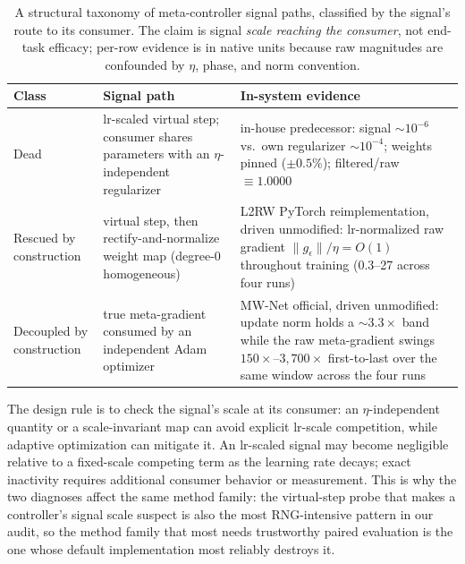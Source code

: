 \begin{table}[tbp]
\centering
\small
\begin{tabular}{@{}p{}p{}p{}@{}}
\toprule
Class & Signal path & In-system evidence \\
\midrule
Dead &
lr-scaled virtual step; consumer shares parameters with an
$\eta$-independent regularizer &
in-house predecessor: signal ${\sim}10^{-6}$ vs.\ own regularizer
${\sim}10^{-4}$; weights pinned ($\pm 0.5\%$); filtered/raw
$\equiv 1.0000$ \\
\addlinespace
Rescued by construction &
virtual step, then rectify-and-normalize weight map (degree-0 homogeneous) &
L2RW PyTorch reimplementation, driven unmodified: lr-normalized raw gradient
$\lVert g_\epsilon \rVert / \eta = O(1)$ throughout training (0.3--27
across four runs) \\
\addlinespace
Decoupled by construction &
true meta-gradient consumed by an independent Adam optimizer &
MW-Net official, driven unmodified: update norm holds a ${\sim}3.3\times$
band while the raw meta-gradient swings $150\times$--$3{,}700\times$
first-to-last over the same window across the four runs \\
\bottomrule
\end{tabular}
\caption{A structural taxonomy of meta-controller signal paths, classified by
the signal's route to its consumer. The claim is signal \emph{scale reaching
the consumer}, not end-task efficacy; per-row evidence is in native units
because raw magnitudes are confounded by $\eta$, phase, and norm convention.}
\label{tab:f1}
\end{table}

The design rule is to check the signal's scale at its consumer: an
$\eta$-independent quantity or a scale-invariant map can avoid explicit
lr-scale competition, while adaptive optimization can mitigate it. An
lr-scaled signal may become negligible relative to a fixed-scale competing
term as the learning rate decays; exact inactivity requires additional
consumer behavior or measurement. This is why the two diagnoses affect the
same method family: the virtual-step probe that makes a controller's signal scale
suspect is also the most RNG-intensive pattern in our audit, so the method family
that most needs trustworthy paired evaluation is the one whose default
implementation most reliably destroys it.

